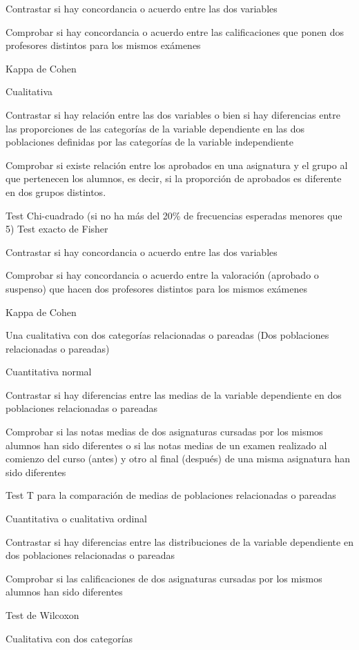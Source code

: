 \documentclass[
  a4paper,
]{scrreport}
\theoremstyle{definition}
\theoremstyle{definition}
\theoremstyle{remark}
\begin{document}
Contrastar si hay concordancia o acuerdo entre las dos variables

Comprobar si hay concordancia o acuerdo entre las calificaciones que
ponen dos profesores distintos para los mismos exámenes

Kappa de Cohen

Cualitativa

Contrastar si hay relación entre las dos variables o bien si hay
diferencias entre las proporciones de las categorías de la variable
dependiente en las dos poblaciones definidas por las categorías de la
variable independiente

Comprobar si existe relación entre los aprobados en una asignatura y el
grupo al que pertenecen los alumnos, es decir, si la proporción de
aprobados es diferente en dos grupos distintos.

Test Chi-cuadrado (si no ha más del 20\% de frecuencias esperadas
menores que 5) Test exacto de Fisher

Contrastar si hay concordancia o acuerdo entre las dos variables

Comprobar si hay concordancia o acuerdo entre la valoración (aprobado o
suspenso) que hacen dos profesores distintos para los mismos exámenes

Kappa de Cohen

Una cualitativa con dos categorías relacionadas o pareadas (Dos
poblaciones relacionadas o pareadas)

Cuantitativa normal

Contrastar si hay diferencias entre las medias de la variable
dependiente en dos poblaciones relacionadas o pareadas

Comprobar si las notas medias de dos asignaturas cursadas por los mismos
alumnos han sido diferentes o si las notas medias de un examen realizado
al comienzo del curso (antes) y otro al final (después) de una misma
asignatura han sido diferentes

Test T para la comparación de medias de poblaciones relacionadas o
pareadas

Cuantitativa o cualitativa ordinal

Contrastar si hay diferencias entre las distribuciones de la variable
dependiente en dos poblaciones relacionadas o pareadas

Comprobar si las calificaciones de dos asignaturas cursadas por los
mismos alumnos han sido diferentes

Test de Wilcoxon

Cualitativa con dos categorías
\end{document}
